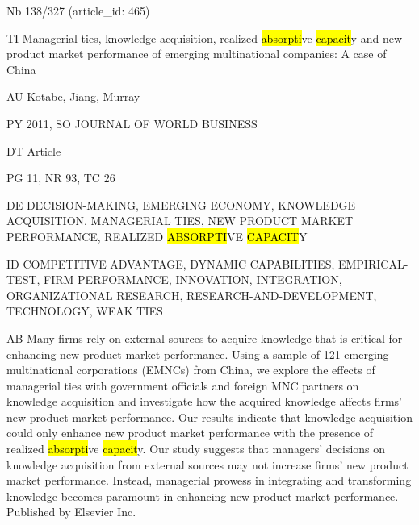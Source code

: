 \documentclass[a4paper]{article}
\begin{document}
\vspace*{-2cm}
Nb \tabto{0cm}138/327 (article\_id: 465)\par
TI \tabto{0cm}Managerial ties, knowledge acquisition, realized \hl{absorpti}ve \hl{capacit}y and new product market performance of emerging multinational companies: A case of China\par
AU \tabto{0cm}Kotabe, Jiang, Murray\par
PY \tabto{0cm}2011, SO JOURNAL OF WORLD BUSINESS\par
DT \tabto{0cm}Article\par
PG \tabto{0cm}11, NR 93, TC 26\par
DE \tabto{0cm}DECISION-MAKING, EMERGING ECONOMY, KNOWLEDGE ACQUISITION, MANAGERIAL TIES, NEW PRODUCT MARKET PERFORMANCE, REALIZED \hl{ABSORPTI}VE \hl{CAPACIT}Y\par
ID \tabto{0cm}COMPETITIVE ADVANTAGE, DYNAMIC CAPABILITIES, EMPIRICAL-TEST, FIRM PERFORMANCE, INNOVATION, INTEGRATION, ORGANIZATIONAL RESEARCH, RESEARCH-AND-DEVELOPMENT, TECHNOLOGY, WEAK TIES\par
AB \tabto{0cm}Many firms rely on external sources to acquire knowledge that is critical for enhancing new product market performance. Using a sample of 121 emerging multinational corporations (EMNCs) from China, we explore the effects of managerial ties with government officials and foreign MNC partners on knowledge acquisition and investigate how the acquired knowledge affects firms' new product market performance. Our results indicate that knowledge acquisition could only enhance new product market performance with the presence of realized \hl{absorpti}ve \hl{capacit}y. Our study suggests that managers' decisions on knowledge acquisition from external sources may not increase firms' new product market performance. Instead, managerial prowess in integrating and transforming knowledge becomes paramount in enhancing new product market performance. Published by Elsevier Inc.\par
\clearpage
\end{document}
